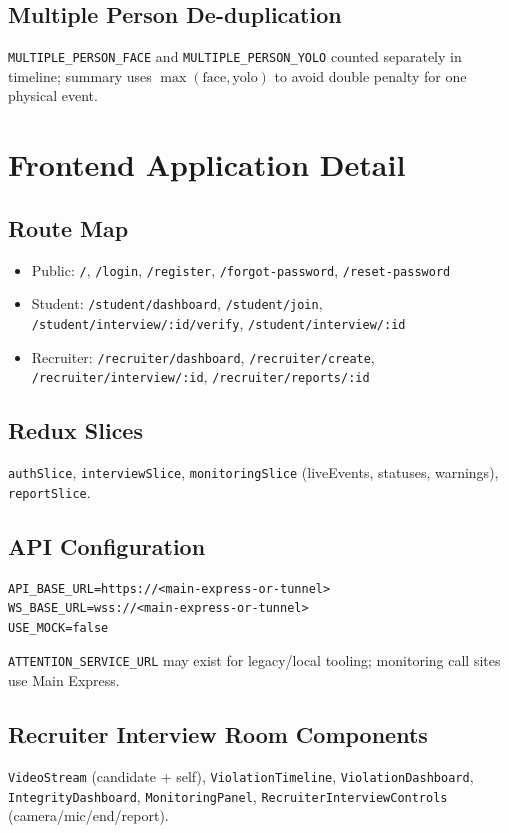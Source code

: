 \documentclass[11pt,a4paper]{report}
\begin{document}
\section{Multiple Person De-duplication}
\texttt{MULTIPLE\_PERSON\_FACE} and \texttt{MULTIPLE\_PERSON\_YOLO} counted separately in timeline; summary uses $\max(\text{face}, \text{yolo})$ to avoid double penalty for one physical event.

\chapter{Frontend Application Detail}

\section{Route Map}
\begin{itemize}
  \item Public: \texttt{/}, \texttt{/login}, \texttt{/register}, \texttt{/forgot-password}, \texttt{/reset-password}
  \item Student: \texttt{/student/dashboard}, \texttt{/student/join}, \texttt{/student/interview/:id/verify}, \texttt{/student/interview/:id}
  \item Recruiter: \texttt{/recruiter/dashboard}, \texttt{/recruiter/create}, \texttt{/recruiter/interview/:id}, \texttt{/recruiter/reports/:id}
\end{itemize}

\section{Redux Slices}
\texttt{authSlice}, \texttt{interviewSlice}, \texttt{monitoringSlice} (liveEvents, statuses, warnings), \texttt{reportSlice}.

\section{API Configuration}
\begin{verbatim}
API_BASE_URL=https://<main-express-or-tunnel>
WS_BASE_URL=wss://<main-express-or-tunnel>
USE_MOCK=false
\end{verbatim}
\texttt{ATTENTION\_SERVICE\_URL} may exist for legacy/local tooling; monitoring call sites use Main Express.

\section{Recruiter Interview Room Components}
\texttt{VideoStream} (candidate + self), \texttt{ViolationTimeline}, \texttt{ViolationDashboard}, \texttt{IntegrityDashboard}, \texttt{MonitoringPanel}, \texttt{RecruiterInterviewControls} (camera/mic/end/report).
\end{document}

